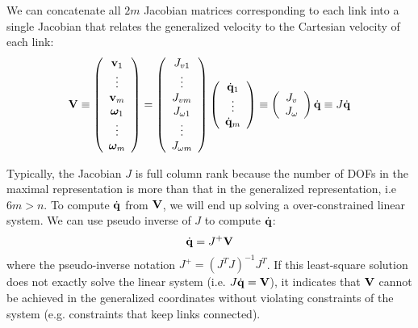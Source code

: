We can concatenate all $2m$ Jacobian matrices corresponding to each link into a single Jacobian
that relates the generalized velocity to the Cartesian velocity of each
link:
\begin{equation}
\mathbf{V} \equiv 
\left(
\begin{array}{c}
\mathbf{v}_1 \\
\vdots \\
\mathbf{v}_m \\
\bm{\omega}_1 \\
\vdots \\
\bm{\omega}_m
\end{array}
\right) = 
\left (
\begin{array}{c}
J_{v1} \\
\vdots \\
J_{vm} \\
J_{\omega 1} \\
\vdots \\
J_{\omega m}
\end{array}
\right) 
\left(
\begin{array}{c}
\dot{\mathbf{q}}_1\\
\vdots \\
\dot{\mathbf{q}}_m
\end{array}
\right)  \equiv \left(
\begin{array}{c}
J_v\\
J_{\omega}
\end{array}
\right)\dot{\mathbf{q}} \equiv J \dot{\mathbf{q}}
\end{equation}

Typically, the Jacobian $J$ is full column rank because the
number of DOFs in the maximal representation is more than that in the
generalized representation, i.e $6m > n$. To compute $\dot{\mathbf{q}}$ from $\mathbf{V}$, we
will end up solving a over-constrained linear system. We can use
pseudo inverse of $J$ to compute $\dot{\mathbf{q}}$:
\begin{equation}
 \dot{\mathbf{q}} =  J^+\mathbf{V}
 \end{equation}
where the pseudo-inverse notation $J^+ = (J^TJ)^{-1}J^T$. If this
least-square solution does not exactly solve the linear
system (i.e. $J \dot{\mathbf{q}} = \mathbf{V}$), it indicates that $\mathbf{V}$ cannot be achieved in the
generalized coordinates without violating constraints of the system
(e.g. constraints that keep links connected).

